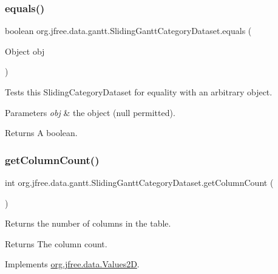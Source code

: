 \subsubsection{\texorpdfstring{equals()}{equals()}}
{\footnotesize\ttfamily boolean org.\+jfree.\+data.\+gantt.\+Sliding\+Gantt\+Category\+Dataset.\+equals (\begin{DoxyParamCaption}\item[{Object}]{obj }\end{DoxyParamCaption})}

Tests this {\ttfamily Sliding\+Category\+Dataset} for equality with an arbitrary object.


\begin{DoxyParams}{Parameters}
{\em obj} & the object ({\ttfamily null} permitted).\\
\hline
\end{DoxyParams}
\begin{DoxyReturn}{Returns}
A boolean. 
\end{DoxyReturn}
\mbox{\label{classorg_1_1jfree_1_1data_1_1gantt_1_1_sliding_gantt_category_dataset_ac28b02fa53e0050471f33e8de23e4330}} 
\subsubsection{\texorpdfstring{get\+Column\+Count()}{getColumnCount()}}
{\footnotesize\ttfamily int org.\+jfree.\+data.\+gantt.\+Sliding\+Gantt\+Category\+Dataset.\+get\+Column\+Count (\begin{DoxyParamCaption}{ }\end{DoxyParamCaption})}

Returns the number of columns in the table.

\begin{DoxyReturn}{Returns}
The column count. 
\end{DoxyReturn}


Implements \mbox{\hyperlink{interfaceorg_1_1jfree_1_1data_1_1_values2_d_a212e32802dc2f32e0fb641740137c685}{org.\+jfree.\+data.\+Values2D}}.

